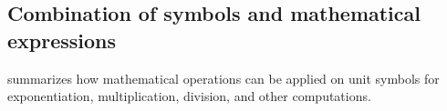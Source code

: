 \documentclass[12pt,notitlepage,onecolumn]{ivoa}
\newcommand{\unit}[1]{\textbf{\textsf{\color{orange}#1}}}
\begin{document}
\subsection{Combination of symbols and mathematical expressions}

 summarizes how mathematical operations can be applied on
unit symbols for exponentiation, multiplication, division, and other computations.

\end{document}
